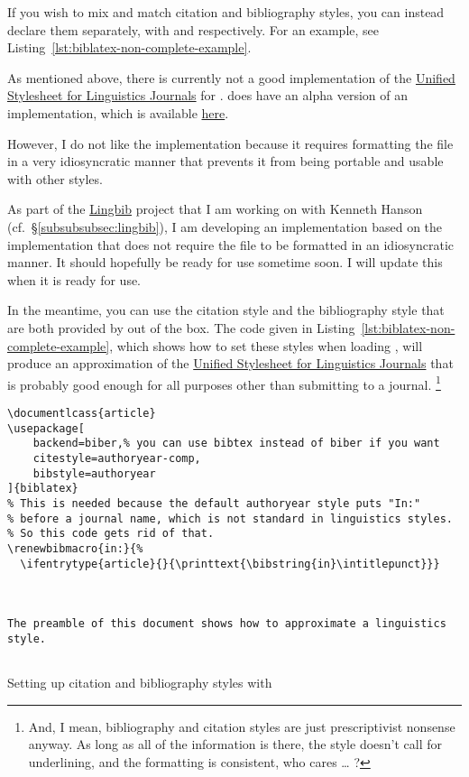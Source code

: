 If you wish to mix and match citation and bibliography styles, you can instead declare them separately, with  and  respectively.
For an example, see Listing~\ref{lst:biblatex-non-complete-example}.

As mentioned above, there is currently not a good implementation of the \href{http://celxj.org/downloads/UnifiedStyleSheet.pdf}{Unified Stylesheet for Linguistics Journals} for .
\href{http://semprag.org/}{} does have an alpha version of an implementation, which is available \href{https://github.com/semprag/biblatex-sp-unified}{here}.

However, I do not like the \href{http://semprag.org/}{} implementation because it requires formatting the  file in a very idiosyncratic manner that prevents it from being portable and usable with other styles.

As part of the \href{https://github.com/lingbib/lingbib}{Lingbib} project that I am working on with Kenneth Hanson (cf.~\S\ref{subsubsubsec:lingbib}), I am developing an implementation based on the \href{http://semprag.org/}{} implementation that does not require the  file to be formatted in an idiosyncratic manner.
It should hopefully be ready for use sometime soon.
I will update this  when it is ready for use.

In the meantime, you can use the  citation style and the  bibliography style that are both provided by  out of the box.
The code given in Listing~\ref{lst:biblatex-non-complete-example}, which shows how to set these styles when loading , will produce an approximation of the \href{http://celxj.org/downloads/UnifiedStyleSheet.pdf}{Unified Stylesheet for Linguistics Journals} that is probably good enough for all purposes other than submitting to a journal.%
\footnote{%
And, I mean, bibliography and citation styles are just prescriptivist nonsense anyway.
As long as all of the information is there, the style doesn't call for underlining, and the formatting is consistent, who cares \ldots{} ?%
}

\begin{listing}[htbp]
	\centering
	\begin{verbatim}
\documentlcass{article}
\usepackage[
    backend=biber,% you can use bibtex instead of biber if you want
    citestyle=authoryear-comp,
    bibstyle=authoryear
]{biblatex}
% This is needed because the default authoryear style puts "In:" 
% before a journal name, which is not standard in linguistics styles.
% So this code gets rid of that.
\renewbibmacro{in:}{%
  \ifentrytype{article}{}{\printtext{\bibstring{in}\intitlepunct}}}



The preamble of this document shows how to approximate a linguistics style.


	\end{verbatim}
	\caption{Setting up citation and bibliography styles with }
	\label{lst:biblatex-non-complete-example}
\end{listing}

